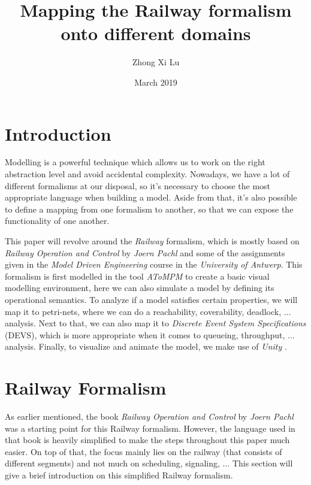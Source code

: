 \documentclass{article}
\title{Mapping the Railway formalism onto different domains}
\author{Zhong Xi Lu}
\date{March 2019}
\begin{document}
\maketitle

\section{Introduction}

Modelling is a powerful technique which allows us to work on the right abstraction level and avoid accidental complexity. Nowadays, we have a lot of different formalisms at our disposal, so it's necessary to choose the most appropriate language when building a model. Aside from that, it's also possible to define a mapping from one formalism to another, so that we can expose the functionality of one another.

This paper will revolve around the \textit{Railway} formalism, which is mostly based on \textit{Railway Operation and Control} \cite{railway_book} by \textit{Joern Pachl} and some of the assignments \cite{assignments} given in the \textit{Model Driven Engineering} course in the \textit{University of Antwerp}. This formalism is first modelled in the tool \textit{AToMPM} \cite{atompm} to create a basic visual modelling environment, here we can also simulate a model by defining its operational semantics. To analyze if a model satisfies certain properties, we will map it to petri-nets, where we can do a reachability, coverability, deadlock, ... analysis. Next to that, we can also map it to \textit{Discrete Event System Specifications} (DEVS), which is more appropriate when it comes to queueing, throughput, ... analysis. Finally, to visualize and animate the model, we make use of \textit{Unity} \cite{unity}. 


\section{Railway Formalism}

As earlier mentioned, the book \textit{Railway Operation and Control} by \textit{Joern Pachl} \cite{railway_book} was a starting point for this Railway formalism. However, the language used in that book is heavily simplified to make the steps throughout this paper much easier. On top of that, the focus mainly lies on the railway (that consists of different segments) and not much on scheduling, signaling, ... This section will give a brief introduction on this simplified Railway formalism.
\end{document}
